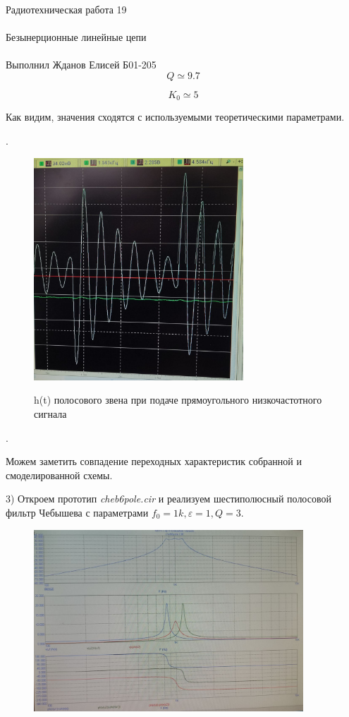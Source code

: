 \documentclass{astroedu-lab}
\begin{document}
\begin{problem}{\huge Радиотехническая работа 19\\\\Безынерционные линейные цепи\\\\Выполнил Жданов Елисей Б01-205}
\[Q \simeq 9.7\]

\[K_0 \simeq 5\]

Как видим, значения сходятся с используемыми теоретическими параметрами.

.

\begin{figure}[!h]
	\centering
	\includegraphics[width=0.7\textwidth]{ht.jpg}
	\label{fig:boiler}
	\caption{h(t) полосового звена при подаче прямоугольного низкочастотного сигнала}
\end{figure}

.

Можем заметить совпадение переходных характеристик собранной и смоделированной схемы.


3) Откроем прототип \textit{cheb6pole.cir} и реализуем шестиполюсный полосовой фильтр Чебышева с параметрами $f_0 = 1k, \varepsilon = 1, Q = 3$.

\begin{figure}[!h]
	\centering
	\includegraphics[width=0.9\textwidth]{gr3.jpg}
	\label{fig:boiler}
\end{figure}


\end{problem}
\end{document}

